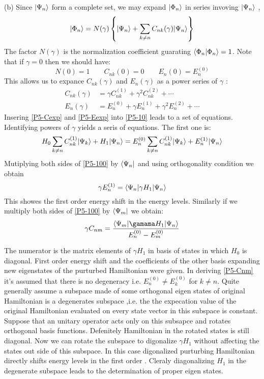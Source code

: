 \begin{homeworkProblem}
\begin{homeworkSection}{(b)}
Since $|\Psi_n\rangle$ form a complete set, we may expand $|\Phi_n\rangle$ in series invoving $|\Psi_n\rangle$ ,
\begin{equation}
|\Phi_n\rangle=N(\gamma)\left\{|\Psi_n\rangle+\sum_{k\neq n}C_{nk}(\gamma)|\Psi_n\rangle\right\}
\end{equation}
The factor $N(\gamma)$ is the normalization coefficient guarating  $\langle\Phi_n|\Phi_n\rangle=1$. Note that if $\gamma=0$ then we should have:
\begin{equation}
N(0)=1\qquad C_{nk}(0)=0\qquad E_{n}(0)=E_n^{(0)}
\end{equation}
This allows us to expance $C_{nk}(\gamma)$  and $E_n(\gamma)$ as a power series of $\gamma$ :
\begin{align}
C_{nk}(\gamma) &=\gamma C_{nk}^{(1)}+\gamma^2 C_{nk}^{(2)}+\cdots\label{P5-Cexp}\\
E_{n}(\gamma)&=E_n^{(0)}+\gamma E_n^{(1)}+\gamma^2 E_n^{(2)}+\cdots\label{P5-Eexp}
\end{align}
Insering \eqref{P5-Cexp} and \eqref{P5-Eexp} into \eqref{P5-10} leads to a set of equations. Identifying powers of $\gamma$  yields a seris of equations. The first one is:
\begin{equation}\label{P5-100}
H_0\sum_{k\neq n}C_{nk}^{(1)}|\Psi_k\rangle+H_1|\Psi_n\rangle=E_n^{(0)}\sum_{k\neq n}C_{nk}^{(1)}|\Psi_k\rangle+E_n^{(1)}|\Psi_n\rangle
\end{equation}
Mutiplying both sides of \eqref{P5-100} by $\langle \Psi_n|$ and using orthogonality condition we obtain
\begin{equation}\label{P5-energyshift}
\gamma E_n^{(1)}=\langle \Psi_n|\gamma H_1|\Psi_n\rangle
\end{equation}
This showes the first order energy shift in the energy levels. Similarly if we multiply both sides of \eqref{P5-100} by $\langle \Psi_m|$ we obtain:
\begin{equation}\label{P5-Cnm}
\gamma C_{nm}=\frac{\bra{\Psi_m}\gamama H_1\ket{\Psi_n}}{E_n^{(0)}-E_m^{(0)}}
\end{equation}
\end{homeworkSection}
The numerator is the matrix elements of $\gamma H_1$ in basis of states in which $H_0$ is diagonal. First order energy shift and the coefficients of the other basis expanding new eigenstates of the purturbed Hamiltonian were given. In deriving \eqref{P5-Cnm} it's assumed that there is no  degeneracy i.e. $E^{(0)}_n\neq E^{(0)}_k $ for $k\neq n$.  Quite generally  assume a subspace made of some orthogonal eigen states of original Hamiltonian is a degenerates subspace ,i.e. the the expecation value of the original Hamiltonian evaluated on every state vector in this subspace is constant. Suppose that an unitary operator acts only on this subsapce and rotates orthogonal basis functions. Defenitely Hamiltonian in the rotated states is still diagonal. Now we can rotate the subspace to digonalize $\gamma H_1$ without affecting the states out side of this subspace. In this case digonalized purturbing Hamiltonian directly shifts energy levels in the first order . Cleraly diagonalizing $H_1$ in the degenerate subspace leads to the determination of proper eigen states.  


\end{homeworkProblem}
